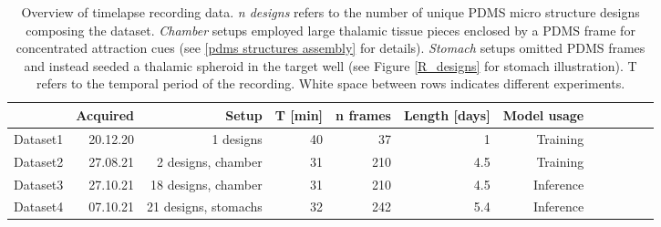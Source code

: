 \begin{table*}[h!]
\begin{adjustbox}{max width=\textwidth,center}
    \begin{tabular}{@{}rrrrrrrrrrrr@{}}
    \toprule
    & Acquired & Setup  & T [min] & n frames & Length [days] & Model usage\\
    \midrule
    \vspace{2mm}
    Dataset1 & 20.12.20 & 1 designs  &  40 & 37  & 1   & Training\\
    Dataset2 & 27.08.21 & 2 designs, chamber  &  31 & 210 & 4.5 & Training\\ 
    \vspace{2mm}
    Dataset3 & 27.10.21 & 18 designs, chamber &  31 & 210 & 4.5 & Inference\\
    Dataset4 & 07.10.21 & 21 designs, stomachs &  32 & 242 & 5.4 & Inference\\
    \bottomrule
    \end{tabular}
\end{adjustbox}
\caption[Overview of timelapse recording data]
        {Overview of timelapse recording data.
         \textit{n designs} refers to the number of unique PDMS micro structure
         designs composing the dataset. \textit{Chamber} setups employed large  
         thalamic tissue pieces enclosed by a PDMS frame for concentrated
         attraction cues (see \ref{pdms structures assembly} for details).
         \textit{Stomach} setups omitted PDMS frames and instead seeded a
         thalamic spheroid in the target well (see Figure \ref{R_designs} for
         stomach illustration). T refers to the temporal period of the
         recording. White space between rows indicates different experiments.}
\label{datasets_table}
\end{table*}


